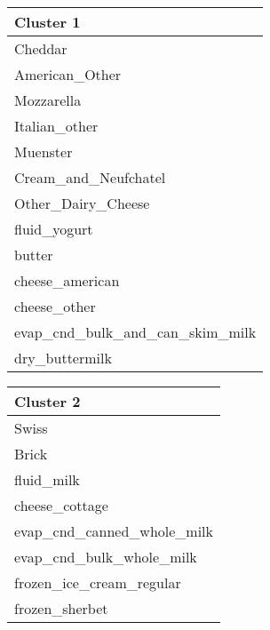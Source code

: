 \begin{table}[htpb]
    \centering
    \small\setlength{\tabcolsep}{1pt}
    \begin{minipage}[t]{.33\linewidth}
        \centering
        \medskip
        \begin{tabular}{l}
            \toprule
            Cluster 1\\
            \midrule
            Cheddar\\
            American\_Other\\
            Mozzarella\\
            Italian\_other\\
            Muenster\\
            Cream\_and\_Neufchatel\\
            Other\_Dairy\_Cheese\\
            fluid\_yogurt\\
            butter\\
            cheese\_american\\
            cheese\_other\\
            evap\_cnd\_bulk\_and\_can\_skim\_milk\\
            dry\_buttermilk\\
            \bottomrule
        \end{tabular}
    \end{minipage}\hfill
    \begin{minipage}[t]{.3\linewidth}
        \centering
        \medskip
        \begin{tabular}{l}
            \toprule
            Cluster 2\\
            \midrule
            Swiss\\
            Brick\\
            fluid\_milk\\
            cheese\_cottage\\
            evap\_cnd\_canned\_whole\_milk\\
            evap\_cnd\_bulk\_whole\_milk\\
            frozen\_ice\_cream\_regular\\
            frozen\_sherbet\\
            \bottomrule 
        \end{tabular}
    \end{minipage}\hfill

\end{table}
